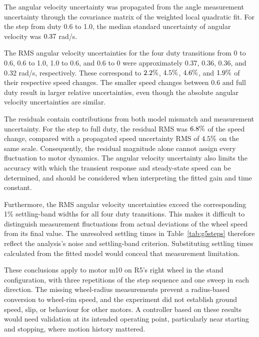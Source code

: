 The angular velocity uncertainty was propagated from the angle
measurement uncertainty through the covariance matrix of the
weighted local quadratic fit. For the step from duty 0.6 to 1.0,
the median standard uncertainty of angular velocity was
$0.37$ rad/s.

The RMS angular velocity uncertainties for the four duty transitions
from 0 to 0.6, 0.6 to 1.0, 1.0 to 0.6, and 0.6 to 0 were
approximately 0.37, 0.36, 0.36, and 0.32 rad/s, respectively.
These correspond to $2.2\%$, $4.5\%$,
$4.6\%$, and $1.9\%$ of their
respective speed changes. The smaller speed changes between
0.6 and full duty result in larger relative uncertainties,
even though the absolute angular velocity uncertainties are similar.

The residuals contain contributions from both model mismatch and
measurement uncertainty. For the step to full duty, the residual RMS was
$6.8\%$ of the speed change, compared with a propagated speed
uncertainty RMS of $4.5\%$ on the same scale.
Consequently, the residual magnitude alone cannot assign every
fluctuation to motor dynamics. The angular velocity uncertainty
also limits the accuracy with which the transient response and
steady-state speed can be determined, and should be considered
when interpreting the fitted gain and time constant.

Furthermore, the RMS angular velocity uncertainties exceed the
corresponding 1\% settling-band widths for all four duty transitions.
This makes it difficult to distinguish measurement fluctuations
from actual deviations of the wheel speed from its final value.
The unresolved settling times in Table~\ref{tab:g5steps} therefore
reflect the analysis's noise and settling-band criterion.
Substituting settling times calculated from the fitted model
would conceal that measurement limitation.

These conclusions apply to motor m10 on R5's right wheel in the stand
configuration, with three repetitions of the step sequence and one sweep
in each direction. The missing wheel-radius measurements prevent a
radius-based conversion to wheel-rim speed, and the experiment did not
establish ground speed, slip, or behaviour for other motors. A controller
based on these results would need validation at its intended operating
point, particularly near starting and stopping, where motion history
mattered.
